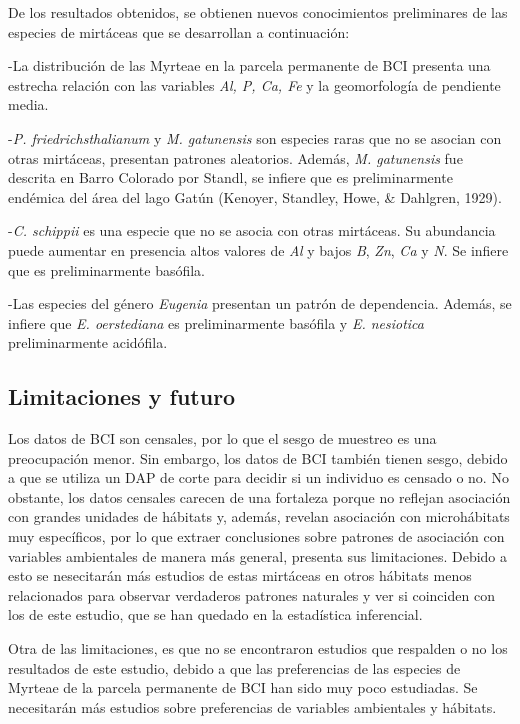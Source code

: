 \documentclass[11pt,]{article}
\begin{document}
De los resultados obtenidos, se obtienen nuevos conocimientos
preliminares de las especies de mirtáceas que se desarrollan a
continuación:

-La distribución de las Myrteae en la parcela permanente de BCI presenta
una estrecha relación con las variables \emph{Al, P, Ca, Fe} y la
geomorfología de pendiente media.

-\emph{P. friedrichsthalianum} y \emph{M. gatunensis} son especies raras
que no se asocian con otras mirtáceas, presentan patrones aleatorios.
Además, \emph{M. gatunensis} fue descrita en Barro Colorado por Standl,
se infiere que es preliminarmente endémica del área del lago Gatún
(Kenoyer, Standley, Howe, \& Dahlgren, 1929).

-\emph{C. schippii} es una especie que no se asocia con otras mirtáceas.
Su abundancia puede aumentar en presencia altos valores de \emph{Al} y
bajos \emph{B}, \emph{Zn}, \emph{Ca} y \emph{N}. Se infiere que es
preliminarmente basófila.

-Las especies del género \emph{Eugenia} presentan un patrón de
dependencia. Además, se infiere que \emph{E. oerstediana} es
preliminarmente basófila y \emph{E. nesiotica} preliminarmente
acidófila.

\subsection{Limitaciones y futuro}\label{limitaciones-y-futuro}

Los datos de BCI son censales, por lo que el sesgo de muestreo es una
preocupación menor. Sin embargo, los datos de BCI también tienen sesgo,
debido a que se utiliza un DAP de corte para decidir si un individuo es
censado o no. No obstante, los datos censales carecen de una fortaleza
porque no reflejan asociación con grandes unidades de hábitats y,
además, revelan asociación con microhábitats muy específicos, por lo que
extraer conclusiones sobre patrones de asociación con variables
ambientales de manera más general, presenta sus limitaciones. Debido a
esto se nesecitarán más estudios de estas mirtáceas en otros hábitats
menos relacionados para observar verdaderos patrones naturales y ver si
coinciden con los de este estudio, que se han quedado en la estadística
inferencial.

Otra de las limitaciones, es que no se encontraron estudios que
respalden o no los resultados de este estudio, debido a que las
preferencias de las especies de Myrteae de la parcela permanente de BCI
han sido muy poco estudiadas. Se necesitarán más estudios sobre
preferencias de variables ambientales y hábitats.
\end{document}
